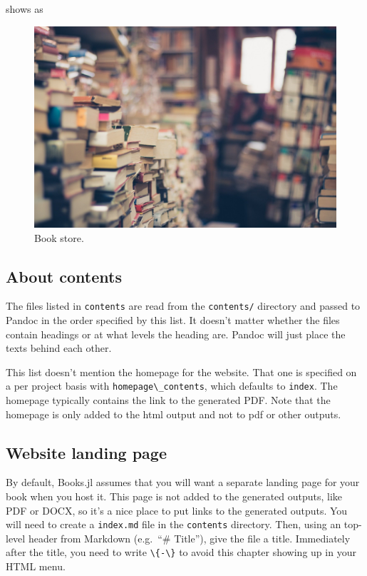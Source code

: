 \documentclass[
  notoc %
]{tufte-book}
\newcommand{\passthrough}[1]{#1}
\begin{document}
shows as

\begin{figure}
\hypertarget{fig:store}{%
\centering
\includegraphics{images/book-store.jpg}
\caption{Book store.}\label{fig:store}
}
\end{figure}

\hypertarget{sec:about_contents}{%
\subsection{About contents}\label{sec:about_contents}}

The files listed in \passthrough{\lstinline!contents!} are read from the
\passthrough{\lstinline!contents/!} directory and passed to Pandoc in
the order specified by this list. It doesn't matter whether the files
contain headings or at what levels the heading are. Pandoc will just
place the texts behind each other.

This list doesn't mention the homepage for the website. That one is
specified on a per project basis with
\passthrough{\lstinline!homepage\_contents!}, which defaults to
\passthrough{\lstinline!index!}. The homepage typically contains the
link to the generated PDF. Note that the homepage is only added to the
html output and not to pdf or other outputs.

\hypertarget{website-landing-page}{%
\subsection{Website landing page}\label{website-landing-page}}

By default, Books.jl assumes that you will want a separate landing page
for your book when you host it. This page is not added to the generated
outputs, like PDF or DOCX, so it's a nice place to put links to the
generated outputs. You will need to create a
\passthrough{\lstinline!index.md!} file in the
\passthrough{\lstinline!contents!} directory. Then, using an top-level
header from Markdown (e.g.~``\# Title''), give the file a title.
Immediately after the title, you need to write
\passthrough{\lstinline!\{-\}!} to avoid this chapter showing up in your
HTML menu.
\end{document}
